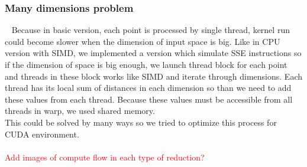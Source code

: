 \subsubsection{Many dimensions problem}~\label{sssec:manyDims}
Because in basic version, each point is processed by single thread, kernel run could become slower when the dimension of input space is big. Like in CPU version with SIMD, we implemented a version which simulate SSE instructions so if the dimension of space is big enough, we launch thread block for each point and threads in these block works like SIMD and iterate through dimensions. Each thread has its local sum of distances in each dimension so than we need to add these values from each thread. Because these values must be accessible from all threads in warp, we used shared memory.\\
This could be solved by many ways so we tried to optimize this process for CUDA environment.\\
\\
\textcolor{red}{Add images of compute flow in each type of reduction?}
\\
